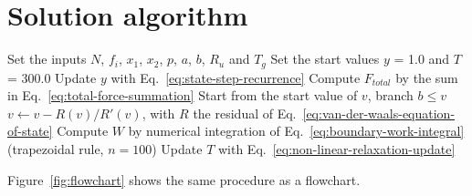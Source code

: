 \section{Solution algorithm}
\begin{algorithm}[htbp]
  \caption{Solution procedure}\label{alg:solution}
  \begin{algorithmic}[1]
    \State Set the inputs $N$, $f_i$, $x_1$, $x_2$, $p$, $a$, $b$, $R_u$ and $T_g$
    \State Set the start values $y$ = \num{1.0} and $T$ = \num{300.0}
      \State Update $y$ with Eq.~\eqref{eq:state-step-recurrence}
    \EndFor
    \State Compute $F_{total}$ by the sum in Eq.~\eqref{eq:total-force-summation}
    \State Start from the start value of $v$, branch $b \le v$
    \Repeat {}
      \State $v \leftarrow v - R(v) / R'(v)$, with $R$ the residual of Eq.~\eqref{eq:van-der-waals-equation-of-state}
    \State Compute $W$ by numerical integration of Eq.~\eqref{eq:boundary-work-integral} (trapezoidal rule, $n = 100$)
    \Repeat
      \State Update $T$ with Eq.~\eqref{eq:non-linear-relaxation-update}
  \end{algorithmic}
\end{algorithm}

Figure~\ref{fig:flowchart} shows the same procedure as a flowchart.

